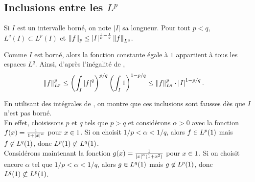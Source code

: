 \subsection{Inclusions entre les $L^p$}

\begin{theo}
Si $I$ est un intervalle borné, on note $|I|$ sa longueur. Pour tout $p < q$, $L^q(I) \subset L^p(I)$ et $\|f\|_p \leq \left| I \right|^{\frac{1}{p} - \frac{1}{q}} \norm{f}_{L^q}$.
\end{theo}

\begin{demo}
Comme $I$ est borné, alors la fonction constante égale à $1$ appartient à tous les espaces $L^q$. Ainsi, d'après l'inégalité de ,
\begin{align*}
\norm{f}_{L^p}^p
&\leq \left(\int_I \left| f \right|^q\right)^{p/q} \left(\int_I 1\right)^{1-p/q}
\leq \norm{f}_{L^q}^p \cdot \left| I \right|^{1-p/q}.
\end{align*}
\end{demo}

\begin{remarque}
En utilisant des intégrales de , on montre que ces inclusions sont fausses dès que $I$ n'est pas borné. \\
En effet, choisissons $p$ et $q$ tels que $p > q$ et considérons $\alpha > 0$ avec la fonction $f(x) = \frac{1}{1+\left| x \right|^\alpha}$ pour $x \in 1$. Si on choisit $1/p < \alpha < 1/q$, alors $f \in L^p(1)$ mais $f \not\in L^q(1)$, donc $L^p(1) \not\subset L^q(1)$. \\
Considérons maintenant la fonction $g(x) = \frac{1}{\left| x \right|^\alpha (1+x^2)}$ pour $x \in 1$. Si on choisit encore $\alpha$ tel que $1/p <  \alpha < 1/q$, alors $g \in L^q(1)$ mais $g \not\in L^p(1)$, donc $L^q(1) \not\subset L^p(1)$.
\end{remarque}


